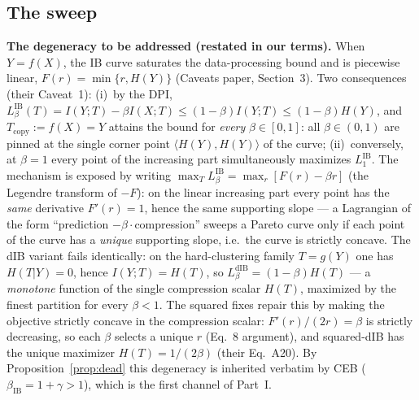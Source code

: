 \subsection{The sweep}

\textbf{The degeneracy to be addressed (restated in our terms).}
When $Y = f(X)$, the IB curve saturates the data-processing bound and is piecewise
linear, $F(r) = \min\{r, H(Y)\}$ (Caveats paper, Section~3). Two consequences (their
Caveat~1): (i)~by the DPI, $L^{\mathrm{IB}}_\beta(T) = I(Y;T) - \beta I(X;T)
\le (1-\beta)I(Y;T) \le (1-\beta)H(Y)$, and $T_{\mathrm{copy}} := f(X) = Y$ attains the
bound for \emph{every} $\beta \in [0,1]$: all $\beta \in (0,1)$ are pinned at the single
corner point $\langle H(Y), H(Y)\rangle$ of the curve; (ii)~conversely, at $\beta = 1$
every point of the increasing part simultaneously maximizes $L^{\mathrm{IB}}_1$. The
mechanism is exposed by writing $\max_T L^{\mathrm{IB}}_\beta = \max_r [F(r) - \beta r]$
(the Legendre transform of $-F$): on the linear increasing part every point has the
\emph{same} derivative $F'(r) = 1$, hence the same supporting slope --- a Lagrangian of
the form ``prediction $-\beta\cdot{}$compression'' sweeps a Pareto curve only if each
point of the curve has a \emph{unique} supporting slope, i.e.\ the curve is strictly
concave. The dIB variant fails identically: on the hard-clustering family $T = g(Y)$ one
has $H(T|Y) = 0$, hence $I(Y;T) = H(T)$, so $L^{\mathrm{dIB}}_\beta = (1-\beta)H(T)$
--- a \emph{monotone} function of the single compression scalar $H(T)$, maximized by the
finest partition for every $\beta < 1$. The squared fixes repair this by making the
objective strictly concave in the compression scalar: $F'(r)/(2r) = \beta$ is strictly
decreasing, so each $\beta$ selects a unique $r$ (Eq.~8 argument), and squared-dIB has
the unique maximizer $H(T) = 1/(2\beta)$ (their Eq.~A20). By Proposition~\ref{prop:dead}
this degeneracy is inherited verbatim by CEB ($\beta_{\mathrm{IB}} = 1+\gamma > 1$),
which is the first channel of Part~I.

